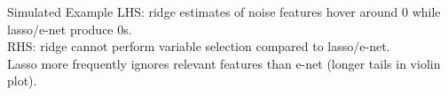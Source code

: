 \documentclass[11pt,compress,t,notes=noshow, xcolor=table]{beamer}
\begin{document}
\begin{vbframe} {Simulated Example}
\footnotesize
LHS: ridge estimates of noise features hover around $0$ while lasso/e-net produce $0$s. \\
RHS: ridge cannot perform variable selection compared to lasso/e-net. \\
Lasso more frequently ignores relevant features than e-net (longer tails in violin plot).\\

\end{vbframe}


\end{document}
